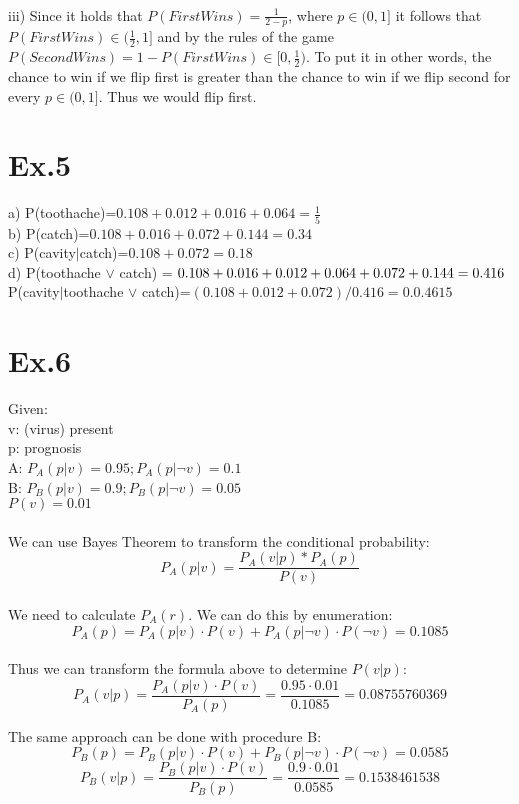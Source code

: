 \documentclass[11pt]{article}
\begin{document}
\\
iii) Since it holds that $P(FirstWins) = \frac{1}{2-p}$, where $p \in (0,1]$ it follows that $P(FirstWins)\in (\frac{1}{2},1]$ and by the rules of the game $P(SecondWins)=1-P(FirstWins)\in[0,\frac{1}{2})$.  To put it in other words, the chance to win if we flip first is greater than the chance to win if we flip second for every $p \in (0,1]$. Thus we would flip first.
\\
\section*{Ex.5}
a) P(toothache)=$0.108+0.012+0.016+0.064=\frac{1}{5}$\\
b) P(catch)=$0.108+0.016+0.072+0.144=0.34$\\
c) P(cavity$|$catch)=$0.108+0.072=0.18$\\
d) P(toothache $\vee$ catch) = $0.108+0.016+0.012+0.064+0.072+0.144=0.416\\
$P(cavity$|$toothache $\vee$ catch)=$(0.108+0.012+0.072)/0.416=0.0.4615$\\

\section*{Ex.6}

Given:\\
v: (virus) present\\
p: prognosis\\
A: $P_A(p|v)=0.95; P_A(p|\neg v)=0.1$\\
B: $P_B(p|v)=0.9; P_B(p|\neg v)=0.05$\\
$P(v)=0.01$\\
\\
We can use Bayes Theorem to transform the conditional probability: \\
$$P_A(p|v)=\frac{P_A(v|p)*P_A(p)}{P(v)}$$ \\
We need to calculate $P_A(r)$. We can do this by enumeration: \\
$$P_A(p) = P_A(p|v) \cdot P(v) + P_A(p|\neg v) \cdot P(\neg v) = 0.1085$$ \\
Thus we can transform the formula above to determine  $P(v|p)$: \\
$$P_A(v|p) = \frac{P_A(p|v) \cdot P(v)}{P_A(p)} = \frac{0.95 \cdot 0.01}{0.1085} = 0.08755760369 $$

The same approach can be done with procedure B:
$$P_B(p) = P_B(p|v) \cdot P(v) + P_B(p|\neg v) \cdot P(\neg v) = 0.0585 $$
$$P_B(v|p) = \frac{P_B(p|v) \cdot P(v)}{P_B(p)} = \frac{0.9 \cdot 0.01}{0.0585} = 0.1538461538$$
\end{document}
